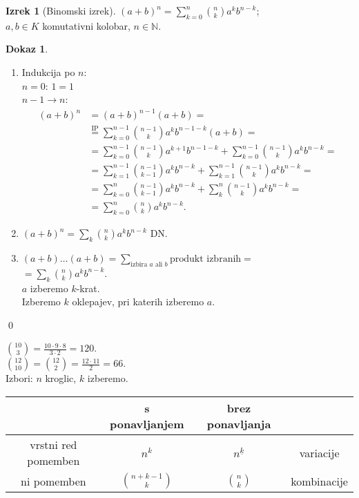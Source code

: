 \documentclass[a4paper, 12pt]{book}
\theoremstyle{definition}
\newtheorem{theorem}[counter]{Izrek}
\newtheorem{pro}[counter]{Dokaz}
\theoremstyle{remark}
\newcommand{\N}{\mathbb{N}}
\begin{document}
\begin{theorem}[Binomski izrek]
  $(a+b)^n = \sum_{k=0}^{n} \binom{n}{k} a^k b^{n-k}$; \\
  $a,b \in K$ komutativni kolobar, $n \in \N$.
\end{theorem}
\begin{pro} \text{} \\
  \begin{enumerate}[label=D\arabic{*}.]
    \item Indukcija po $n$: \\
      $n=0$: $1=1$ \\
      $n-1 \to n$:
      \begin{align*}
        (a+b)^n &= (a+b)^{n-1}(a+b) = \\
        &\stackrel{\text{IP}}{=} \sum_{k=0}^{n-1} \binom{n-1}{k} a^k b^{n-1-k} (a+b) = \\
        &= \sum_{k=0}^{n-1} \binom{n-1}{k} a^{k+1} b^{n-1-k} + \sum_{k=0}^{n-1} \binom{n-1}{k} a^k b^{n-k} = \\
        &= \sum_{k=1}^{n-1} \binom{n-1}{k-1} a^{k} b^{n-k} + \sum_{k=1}^{n-1} \binom{n-1}{k} a^k b^{n-k} = \\
        &= \sum_{k=0}^{n} \binom{n-1}{k-1} a^{k} b^{n-k} + \sum_{k}^{n} \binom{n-1}{k} a^k b^{n-k} = \\
        &= \sum_{k=0}^{n} \binom{n}{k} a^k b^{n-k}.
      \end{align*}
    \item $(a+b)^n = \sum_k \binom{n}{k} a^k b^{n-k}$ DN.
    \item $(a+b) \dots (a+b) = \sum_{\text{izbira $a$ ali $b$}} \text{produkt izbranih} =$\\
      $= \sum_{k} \binom{n}{k} a^k b^{n-k}$. \\
      $a$ izberemo $k$-krat. \\
      Izberemo $k$ oklepajev, pri katerih izberemo $a$.
  \end{enumerate}
  \qed
\end{pro}
$\binom{10}{3} = \frac{10 \cdot 9 \cdot 8}{3 \cdot 2} = 120$. \\
$\binom{12}{10} = \binom{12}{2} = \frac{12 \cdot 11}{2} = 66$. \\
Izbori: $n$ kroglic, $k$ izberemo. \\
\begin{center}
  \begin{tabular}{c | c | c |c}
    & s ponavljanjem & brez ponavljanja & \\
    \hline
    vrstni red pomemben & $n^k$ & $n^{\underline{k}}$ & variacije \\
    ni pomemben & $\binom{n+k-1}{k}$ & $\binom{n}{k}$ & kombinacije
  \end{tabular}
\end{center}
\end{document}
